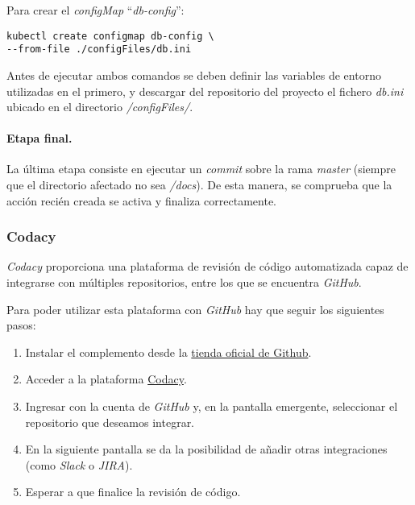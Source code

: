 Para crear el \emph{configMap} ``\emph{db-config}'':

\begin{verbatim}
kubectl create configmap db-config \
--from-file ./configFiles/db.ini
\end{verbatim}

Antes de ejecutar ambos comandos se deben definir las variables de
entorno utilizadas en el primero, y descargar del repositorio del
proyecto el fichero \emph{db.ini} ubicado en el directorio
\emph{/configFiles/}.


\paragraph{Etapa final.}

La última etapa consiste en ejecutar un \emph{commit} sobre la rama
\emph{master} (siempre que el directorio afectado no sea \emph{/docs}).
De esta manera, se comprueba que la acción recién creada se activa y
finaliza correctamente.


\subsubsection{Codacy}

\emph{Codacy} proporciona una plataforma de revisión de código
automatizada capaz de integrarse con múltiples repositorios, entre los
que se encuentra \emph{GitHub}.

Para poder utilizar esta plataforma con \emph{GitHub} hay que seguir los
siguientes pasos:

\begin{enumerate}
\def\labelenumi{\arabic{enumi}.}
\tightlist
\item
  Instalar el complemento desde la
  \href{https://github.com/marketplace/codacy}{tienda oficial de
  Github}.
\item
  Acceder a la plataforma \href{https://codacy.com}{Codacy}.
\item
  Ingresar con la cuenta de \emph{GitHub} y, en la pantalla emergente,
  seleccionar el repositorio que deseamos integrar.
\item
  En la siguiente pantalla se da la posibilidad de añadir otras
  integraciones (como \emph{Slack} o \emph{JIRA}).
\item
  Esperar a que finalice la revisión de código.
\end{enumerate}

